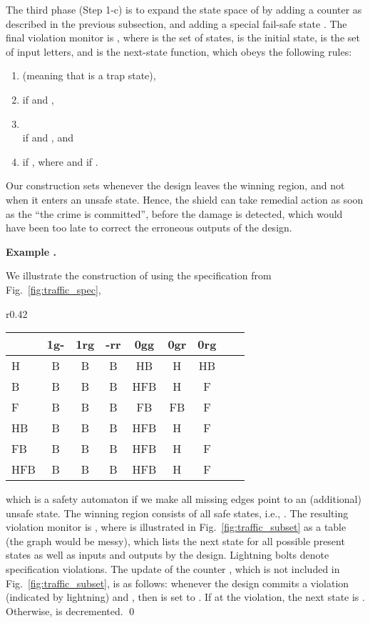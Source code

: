 \documentclass{llncs}
\newcounter{exacounter}
\newenvironment{exa}{
\refstepcounter{exacounter}
\smallskip\noindent
\textbf{Example \theexacounter.}
}{\vspace{2mm}}
\newcommand{\err}{{\color{darkred}}}
\begin{document}
The third phase (Step 1-c) is to expand the state space of  
by adding a counter  as described in the previous 
subsection, and adding a special fail-safe state .   
The final violation monitor is , where  is 
the set of states,  is the initial state,  
is the set of input letters, and  is the next-state function, 
which obeys the following rules:
\begin{enumerate}
\item  
      (meaning that  is a trap state), \label{eq:subset_s}
\item  if  and
      , 
      \label{eq:subset_a}
\item \\
if  and , 
and
\label{eq:subset_m}
\item 
if ,
where  and  if .  
\label{eq:subset_n}
\end{enumerate}
Our construction sets  whenever the design leaves the winning 
region, and not when it enters an unsafe state.  Hence, the shield 
 can take remedial action as soon as the ``the crime is 
committed'', before the damage is detected, which would have been too 
late to correct the erroneous outputs of the design. 


\begin{exa}
We illustrate the construction of  using the specification 
from Fig.~\ref{fig:traffic_spec}, 
\begin{wrapfigure}[10]{r}{0.42\textwidth}
\vspace{-0.7cm}
\begin{tabular}{l|cccccccc}
    &1g-   &1rg   &-rr &0gg     &0gr    &0rg    \\
\hline
H   &B\err &B\err &B   &HB\err  &H      &HB\err \\
B   &B\err &B\err &B   &HFB\err &H      &F      \\
F   &B\err &B\err &B   &FB\err  &FB\err &F      \\
HB  &B\err &B\err &B   &HFB\err &H      &F      \\
FB  &B\err &B\err &B   &HFB\err &H      &F      \\
HFB &B\err &B\err &B   &HFB\err &H      &F      \\
\hline
\end{tabular}
\caption{ for the spec from Fig.~\ref{fig:traffic_spec}.}
\label{fig:traffic_subset}
\end{wrapfigure}
which is a safety automaton if we make all missing edges point to an 
(additional) unsafe state.  The winning region consists of all safe 
states, i.e., .  The resulting violation monitor is 
, where 
 is illustrated in Fig.~\ref{fig:traffic_subset} as a table
(the graph would be messy), which lists the next state for all possible 
present states as well as inputs and outputs by the design.  Lightning 
bolts denote specification 
violations. The update of the counter , which is not included in 
Fig.~\ref{fig:traffic_subset}, is as follows: whenever the design 
commits a violation (indicated by lightning) and , then  is 
set to . If  at the violation, the next state is .  
Otherwise,  is decremented.  \qed

\end{exa}
\end{document}
